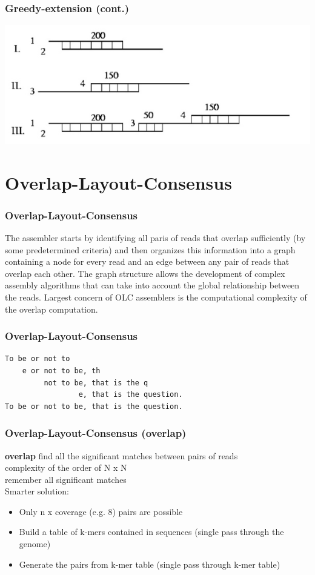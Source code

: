 \documentclass[pdf]{beamer}
\begin{document}
\begin{frame}
\frametitle{Greedy-extension (cont.)}
\begin{center}
\includegraphics[scale=1]{Figures/greedy.jpg} 
\end{center}
\end{frame}

\section{Overlap-Layout-Consensus}

\begin{frame}[fragile]
\frametitle{Overlap-Layout-Consensus}
The assembler starts by identifying all paris of reads that overlap sufficiently (by some predetermined criteria) and then organizes this information into a graph containing a node for every read and an edge between any pair of reads that overlap each other. The graph structure allows the development of complex assembly algorithms that can take into account the global relationship between the reads.
\vspace{0.2in}
Largest concern of OLC assemblers is the computational complexity of the overlap computation.
\end{frame} 

\begin{frame}[fragile]
\frametitle{Overlap-Layout-Consensus}
\begin{verbatim}
To be or not to
    e or not to be, th
         not to be, that is the q
                 e, that is the question.
To be or not to be, that is the question.
\end{verbatim}
\end{frame}

\begin{frame}
\frametitle{Overlap-Layout-Consensus (overlap)}
\textbf{overlap}
find all the significant matches between pairs of reads\\
complexity of the order of N x N\\
remember all significant matches\\
Smarter solution:
\begin{small}
\begin{itemize}
\item Only n x coverage (e.g. 8) pairs are possible
\item Build a table of k-mers contained in sequences (single pass through the genome)
\item Generate the pairs from k-mer table (single pass through k-mer table)
\end{itemize}
\end{small}
\end{frame}
\end{document}
